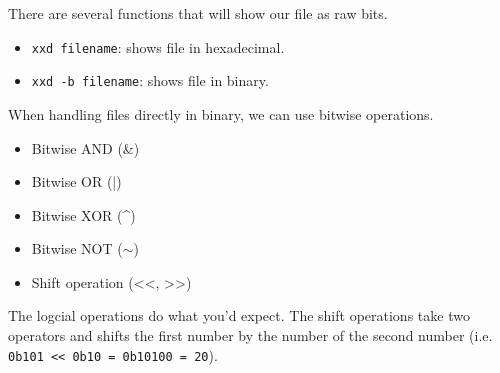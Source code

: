 \documentclass[nobib]{tufte-handout}
\begin{document}
There are several functions that will show our file 
as raw bits. 
\begin{itemize}
   \item \texttt{xxd filename}: shows file in hexadecimal. 
   \item \texttt{xxd -b filename}: shows file in binary. 
\end{itemize}
When handling files directly in binary, we can use 
bitwise operations. 
\begin{itemize}
   \item Bitwise AND (\&) 
   \item Bitwise OR (|) 
   \item Bitwise XOR (\^{})
   \item Bitwise NOT ($\sim$)
   \item Shift operation (<<, >>)
\end{itemize}
The logcial operations do what you'd 
expect. The shift operations take two 
operators and shifts the first number 
by the number of the second number (i.e. 
\texttt{0b101 << 0b10 = 0b10100 = 20}).
\end{document}
